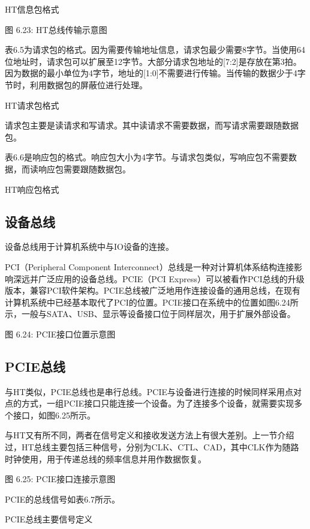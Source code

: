 \documentclass[]{ctexbook}
\begin{document}
\label{tab:ht-packet-format}HT信息包格式

图 6.23: HT总线传输示意图

表6.5为请求包的格式。因为需要传输地址信息，请求包最少需要8字节。当使用64位地址时，请求包可以扩展至12字节。大部分请求包地址的{[}7:2{]}是存放在第3拍。因为数据的最小单位为4字节，地址的{[}1:0{]}不需要进行传输。当传输的数据少于4字节时，利用数据包的屏蔽位进行处理。

\label{tab:ht-request}HT请求包格式

请求包主要是读请求和写请求。其中读请求不需要数据，而写请求需要跟随数据包。

表6.6是响应包的格式。响应包大小为4字节。与请求包类似，写响应包不需要数据，而读响应包需要跟随数据包。

\label{tab:ht-response}HT响应包格式

\hypertarget{ux8bbeux5907ux603bux7ebf}{%
\subsection{设备总线}\label{ux8bbeux5907ux603bux7ebf}}

设备总线用于计算机系统中与IO设备的连接。

PCI（Peripheral Component Interconnect）总线是一种对计算机体系结构连接影响深远并广泛应用的设备总线。PCIE（PCI Express）可以被看作PCI总线的升级版本，兼容PCI软件架构。PCIE总线被广泛地用作连接设备的通用总线，在现有计算机系统中已经基本取代了PCI的位置。PCIE接口在系统中的位置如图6.24所示，一般与SATA、USB、显示等设备接口位于同样层次，用于扩展外部设备。

图 6.24: PCIE接口位置示意图

\hypertarget{pcieux603bux7ebf}{%
\subsection{PCIE总线}\label{pcieux603bux7ebf}}

与HT类似，PCIE总线也是串行总线。PCIE与设备进行连接的时候同样采用点对点的方式，一组PCIE接口只能连接一个设备。为了连接多个设备，就需要实现多个接口，如图6.25所示。

与HT又有所不同，两者在信号定义和接收发送方法上有很大差别。上一节介绍过，HT总线主要包括三种信号，分别为CLK、CTL、CAD，其中CLK作为随路时钟使用，用于传递总线的频率信息并用作数据恢复。

图 6.25: PCIE接口连接示意图

PCIE的总线信号如表6.7所示。

\label{tab:pcie-signals}PCIE总线主要信号定义
\end{document}
